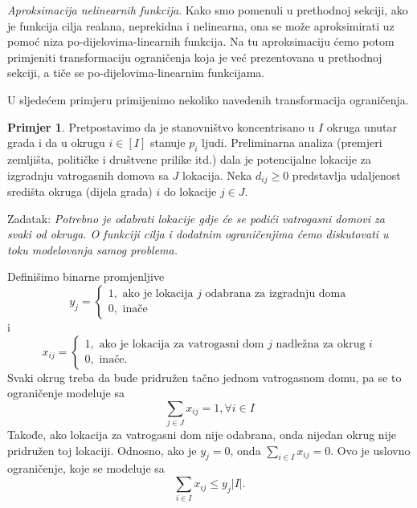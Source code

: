 \documentclass[a4paper, utf8, 11pt, colorlinks]{book}
\theoremstyle{definition}
\newtheorem{primjer}{Primjer}[chapter]
\begin{document}

\emph{Aproksimacija nelinearnih funkcija}. Kako smo pomenuli u prethodnoj sekciji, ako je funkcija cilja realana, neprekidna i nelinearna, ona se može aproksimirati uz pomoć  niza po-dijelovima-linearnih funkcija. Na tu aproksimaciju ćemo potom primjeniti transformaciju ograničenja koja je već prezentovana u prethodnoj sekciji, a tiče se po-dijelovima-linearnim funkcijama. 

U sljedećem primjeru primijenimo nekoliko navedenih transformacija ograničenja.


\begin{primjer} Pretpostavimo da je stanovništvo koncentrisano u $I$ okruga  unutar grada i da u okrugu $i\in [I]$ stanuje $p_i$ ljudi. Preliminarna analiza (premjeri zemljišta, političke i društvene prilike itd.) dala je potencijalne lokacije za izgradnju vatrogasnih domova sa $J$ lokacija. Neka $d_{ij} \geq 0$ predstavlja udaljenost   središta okruga (dijela grada) $i$  do lokacije $j \in J $. 
\end{primjer}
Zadatak: \emph{Potrebno je odabrati lokacije gdje će se podići vatrogasni domovi za svaki od okruga. O funkciji cilja i dodatnim ograničenjima ćemo diskutovati u toku modelovanja samog problema.}

Definišimo binarne promjenljive 
$$y_j = \begin{cases}
              1, \mbox{ ako je lokacija } j \mbox{ odabrana za izgradnju doma} \\
              0, \mbox{ inače}
        \end{cases}$$
i 
$$
x_{ij}= \begin{cases}
             1, \mbox{ ako je lokacija za vatrogasni dom } j \mbox{ nadležna za okrug } i \\
             0, \mbox{ inače}. 
        \end{cases}
$$
Svaki okrug treba da bude pridružen tačno jednom vatrogasnom domu, pa se to ograničenje modeluje sa
\begin{equation}\label{eq:ex-constr-1}
      \sum_{j \in J} x_{ij} = 1, \forall i \in I
\end{equation}
Takođe, ako lokacija za vatrogasni dom nije odabrana, onda nijedan okrug nije pridružen toj lokaciji. Odnosno, ako je $y_j = 0$, onda $ \sum_{i \in I} x_{ij} = 0$. Ovo je uslovno ograničenje, koje se modeluje sa
\begin{equation}\label{eq:ex-constr-2}
    \sum_{i \in I} x_{ij} \leq y_j |I|.
 \end{equation}
\end{document}
